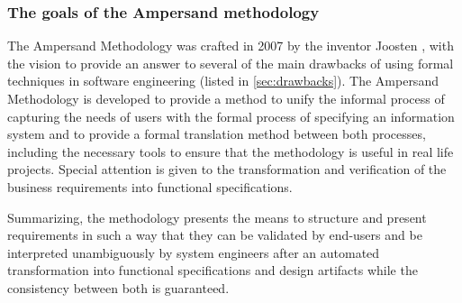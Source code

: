 \begin{description}
\end{description}


\subsubsection{The goals of the Ampersand methodology}
   
The Ampersand Methodology was crafted in 2007 by the inventor Joosten , with the vision to provide an answer to several of the main drawbacks of using formal techniques  in software engineering (listed in \autoref{sec:drawbacks}). 
The Ampersand Methodology is  developed to provide a method to unify the informal process of capturing the needs of users with the formal process of specifying an information system and to provide a formal translation method between both processes, including the necessary tools to ensure that the methodology is useful in real life projects.
Special attention is given to the transformation and verification of the business requirements into functional specifications.

Summarizing, the methodology presents the means to structure and present requirements in such a way that they can be validated by end-users and be interpreted unambiguously by system engineers after an automated transformation into functional specifications and design artifacts while the consistency between both is guaranteed.

